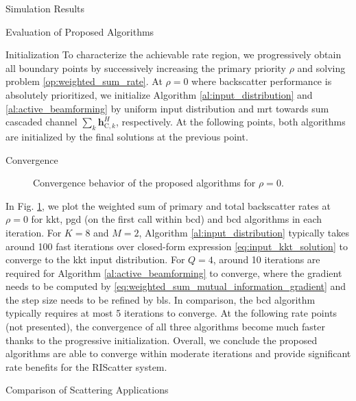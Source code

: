 \documentclass[journal]{IEEEtran}
\begin{document}
\begin{section}{Simulation Results}
	\begin{subsection}{Evaluation of Proposed Algorithms}
		\begin{subsubsection}{Initialization}
			To characterize the achievable rate region, we progressively obtain all boundary points by successively increasing the primary priority $\rho$ and solving problem \eqref{op:weighted_sum_rate}.
			At $\rho=0$ where backscatter performance is absolutely prioritized, we initialize Algorithm \ref{al:input_distribution} and \ref{al:active_beamforming} by uniform input distribution and \gls{mrt} towards sum cascaded channel $\sum_{k} \boldsymbol{h}_{\mathrm{C},k}^H$, respectively.
			At the following points, both algorithms are initialized by the final solutions at the previous point.
		\end{subsubsection}

		\begin{subsubsection}{Convergence}
			\begin{figure}[!t]
				\centering
				\resizebox{0.75\columnwidth}{!}{
					
				}
				\caption{Convergence behavior of the proposed algorithms for $\rho=0$.}
				\label{fg:wsr_convergence}
			\end{figure}

			In Fig. \ref{fg:wsr_convergence}, we plot the weighted sum of primary and total backscatter rates at $\rho=0$ for \gls{kkt}, \gls{pgd} (on the first call within \gls{bcd}) and \gls{bcd} algorithms in each iteration.
			For $K=8$ and $M=2$, Algorithm \ref{al:input_distribution} typically takes around \num{100} fast iterations over closed-form expression \eqref{eq:input_kkt_solution} to converge to the \gls{kkt} input distribution.
			For $Q=4$, around \num{10} iterations are required for Algorithm \ref{al:active_beamforming} to converge, where the gradient needs to be computed by \eqref{eq:weighted_sum_mutual_information_gradient} and the step size needs to be refined by \gls{bls}.
			In comparison, the \gls{bcd} algorithm typically requires at most \num{5} iterations to converge.
			At the following rate points (not presented), the convergence of all three algorithms become much faster thanks to the progressive initialization.
			Overall, we conclude the proposed algorithms are able to converge within moderate iterations and provide significant rate benefits for the RIScatter system.
		\end{subsubsection}
	\end{subsection}

	\begin{subsection}{Comparison of Scattering Applications}


\end{subsection}
\end{section}
\end{document}
